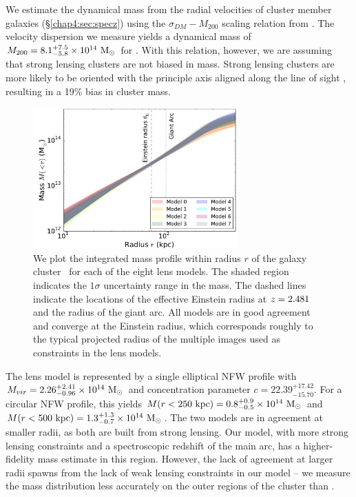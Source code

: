 We estimate the dynamical mass from the radial velocities of cluster member galaxies (\S\ref{chap4:sec:specz}) using the $\sigma_{DM}-M_{200}$ scaling relation from \citet{Evrard:2008uo}. The velocity dispersion we measure yields a dynamical mass of $M_{200} = 8.1^{+7.5}_{-5.8}\times10^{14}\ \mathrm{M_\odot}$ for \cluster. With this relation, however, we are assuming that strong lensing clusters are not biased in mass. Strong lensing clusters are more likely to be oriented with the principle axis aligned along the line of sight \citep{Hennawi:2007ek}, resulting in a 19\% bias in cluster mass.

\begin{figure}
\centering
\includegraphics[width=0.7\textwidth]{Chap4/c4f7.pdf}
\caption[Integrated mass profile of \cluster]{We plot the integrated mass profile within radius $r$ of the galaxy cluster \cluster\ for each of the eight lens models. The shaded region indicates the $1\sigma$ uncertainty range in the mass. The dashed lines indicate the locations of the effective Einstein radius at $z=2.481$ and the radius of the giant arc. All models are in good agreement and converge at the Einstein radius, which corresponds roughly to the typical projected radius of the multiple images used as constraints in the lens models.}
\label{chap4:fig:mass_profile}
\end{figure}

The \citet{Oguri:2012bs} lens model is represented by a single elliptical NFW profile with $M_{vir}=2.26^{+2.41}_{-0.96}\times10^{14}\ \msol$ and concentration parameter $c=22.39^{+17.42}_{-15.70}$. For a circular NFW profile, this yields $M(r<250\ \mathrm{kpc}) = 0.8^{+0.9}_{-0.5}\times10^{14}\ \mathrm{M_\odot}$ and $M(r<500\ \mathrm{kpc}) = 1.3^{+1.3}_{-0.7}\times10^{14}\ \mathrm{M_\odot}$. The two models are in agreement at smaller radii, as both are built from strong lensing. Our model, with more strong lensing constraints and a spectroscopic redshift of the main arc, has a higher-fidelity mass estimate in this region. However, the lack of agreement at larger radii spawns from the lack of weak lensing constraints in our model -- we measure the mass distribution less accurately on the outer regions of the cluster than \citet{Oguri:2012bs}.

